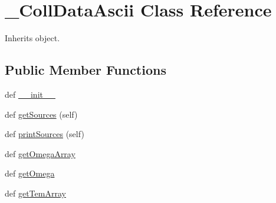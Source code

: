 \hypertarget{classpyneb_1_1core_1_1pynebcore_1_1___coll_data_ascii}{}\section{\+\_\+\+Coll\+Data\+Ascii Class Reference}
\label{classpyneb_1_1core_1_1pynebcore_1_1___coll_data_ascii}


Inherits object.

\subsection*{Public Member Functions}
\begin{DoxyCompactItemize}
\item 
def \hyperlink{classpyneb_1_1core_1_1pynebcore_1_1___coll_data_ascii_ac775ee34451fdfa742b318538164070e}{\+\_\+\+\_\+init\+\_\+\+\_\+}
\item 
def \hyperlink{classpyneb_1_1core_1_1pynebcore_1_1___coll_data_ascii_ada746cff051b4eefa5f61aa4ad0e7fa6}{get\+Sources} (self)
\item 
def \hyperlink{classpyneb_1_1core_1_1pynebcore_1_1___coll_data_ascii_a8391e786a420d63ed15d4efd3f04aad5}{print\+Sources} (self)
\item 
def \hyperlink{classpyneb_1_1core_1_1pynebcore_1_1___coll_data_ascii_abe866c7263d184180cefd99da4439667}{get\+Omega\+Array}
\item 
def \hyperlink{classpyneb_1_1core_1_1pynebcore_1_1___coll_data_ascii_aaf6e92dda1e6d1aa7d06098b4e9a4e6d}{get\+Omega}
\item 
def \hyperlink{classpyneb_1_1core_1_1pynebcore_1_1___coll_data_ascii_a903ccea78642f5853c9a01b1616c6899}{get\+Tem\+Array}
\end{DoxyCompactItemize}
